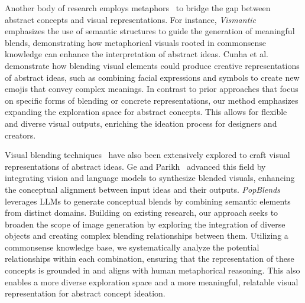 Another body of research employs metaphors~\cite{chakrabarty-etal-2023-spy} to bridge the gap between abstract concepts and visual representations.
For instance, \textit{Vismantic}~\cite{xiao2015vismantic} emphasizes the use of semantic structures to guide the generation of meaningful blends, demonstrating how metaphorical visuals rooted in commonsense knowledge can enhance the interpretation of abstract ideas.
Cunha et al.~\cite{10.1007/s00354-020-00107-x} demonstrate how blending visual elements could produce creative representations of abstract ideas, such as combining facial expressions and symbols to create new emojis that convey complex meanings.
In contrast to prior approaches that focus on specific forms of blending or concrete representations, our method emphasizes expanding the exploration space for abstract concepts. This allows for flexible and diverse visual outputs, enriching the ideation process for designers and creators.


Visual blending techniques~\cite{ge2021visualconceptualblendinglargescale,10.1145/3290605.3300402,10.1145/3411764.3445089} have also been extensively explored to craft visual representations of abstract ideas.
Ge and Parikh~\cite{ge2021visualconceptualblendinglargescale} advanced this field by integrating vision and language models to synthesize blended visuals, enhancing the conceptual alignment between input ideas and their outputs.
\textit{PopBlends}~\cite{10.1145/3544548.3580948} leverages LLMs to generate conceptual blends by combining semantic elements from distinct domains. 
Building on existing research, our approach seeks to broaden the scope of image generation by exploring the integration of diverse objects and creating complex blending relationships between them.
Utilizing a commonsense knowledge base, we systematically analyze the potential relationships within each combination, ensuring that the representation of these concepts is grounded in and aligns with human metaphorical reasoning.
This also enables a more diverse exploration space and a more meaningful, relatable visual representation for abstract concept ideation.





